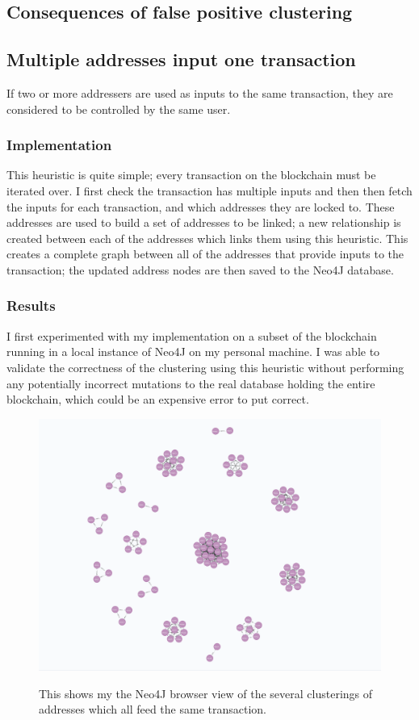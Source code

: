 \begin{itemize}
\subsection{Consequences of false positive clustering} 

\subsection{Multiple addresses input one transaction}
If two or more addressers are used as inputs to the same transaction, they are considered to be controlled by the same user. 
\subsubsection{Implementation}
This heuristic is quite simple; every transaction on the blockchain must be iterated over. I first check the transaction has multiple inputs and then then fetch the inputs for each transaction, and which addresses they are locked to. These addresses are used to build a set of addresses to be linked; a new relationship is created between each of the addresses which links them using this heuristic. This creates a complete graph between all of the addresses that provide inputs to the transaction; the updated address nodes are then saved to the Neo4J database. 

\subsubsection{Results}
I first experimented with my implementation on a subset of the blockchain running in a local instance of Neo4J on my personal machine. I was able to validate the correctness of the clustering using this heuristic without performing any potentially incorrect mutations to the real database holding the entire blockchain, which could be an expensive error to put correct. 

\begin{figure}[h!]
  \centering
  \includegraphics[width = 15cm]{./figures/many-clusters-heuristic-1}\\[0.5cm] 
  \caption{This shows my the Neo4J browser view of the several clusterings of addresses which all feed the same transaction.}
  \label{fig:neo4j-many-heuristic-1-clusters}
\end{figure}


\end{itemize}
